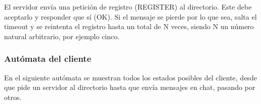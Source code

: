 \documentclass{article}
\begin{document}

El servidor envía una petición de registro (REGISTER) al directorio. Este debe aceptarlo y responder que sí (OK). Si el mensaje se pierde por lo que sea, salta el timeout y se reintenta el registro hasta un total de N veces, siendo N un número natural arbitrario, por ejemplo cinco.

\subsubsection{Autómata del cliente}

En el siguiente autómata se muestran todos los estados posibles del cliente, desde que pide un servidor al directorio hasta que envía mensajes en chat, pasando por otros.
\end{document}
